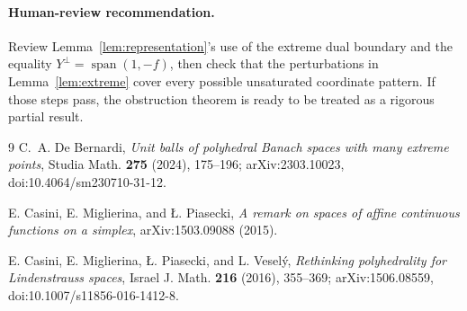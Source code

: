 \documentclass[11pt]{article}
\begin{document}
\paragraph{Human-review recommendation.}
Review Lemma~\ref{lem:representation}'s use of the extreme dual boundary and
the equality $Y^\perp=\operatorname{span}(1,-f)$, then check that the
perturbations in Lemma~\ref{lem:extreme} cover every possible unsaturated
coordinate pattern. If those steps pass, the obstruction theorem is ready
to be treated as a rigorous partial result.

\begin{thebibliography}{9}
C.~A. De Bernardi,
\emph{Unit balls of polyhedral Banach spaces with many extreme points},
Studia Math. \textbf{275} (2024), 175--196;
arXiv:2303.10023, doi:10.4064/sm230710-31-12.

E. Casini, E. Miglierina, and \L. Piasecki,
\emph{A remark on spaces of affine continuous functions on a simplex},
arXiv:1503.09088 (2015).

E. Casini, E. Miglierina, \L. Piasecki, and L. Vesel\'y,
\emph{Rethinking polyhedrality for Lindenstrauss spaces},
Israel J. Math. \textbf{216} (2016), 355--369;
arXiv:1506.08559, doi:10.1007/s11856-016-1412-8.
\end{thebibliography}
\end{document}
